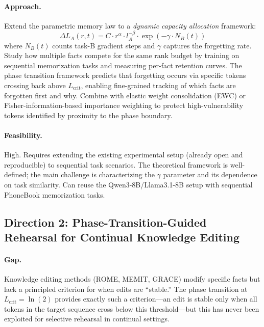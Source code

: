 \documentclass[11pt,a4paper]{article}
\begin{document}
\paragraph{Approach.} Extend the parametric memory law to a \emph{dynamic capacity allocation} framework:
\begin{equation}
\Delta L_A(r, t) = C \cdot r^{\alpha} \cdot l_A^{-\beta} \cdot \exp(-\gamma \cdot N_B(t))
\end{equation}
where $N_B(t)$ counts task-B gradient steps and $\gamma$ captures the forgetting rate. Study how multiple facts compete for the same rank budget by training on sequential memorization tasks and measuring per-fact retention curves. The phase transition framework predicts that forgetting occurs via specific tokens crossing back above $L_{\mathrm{crit}}$, enabling fine-grained tracking of which facts are forgotten first and why. Combine with elastic weight consolidation (EWC) or Fisher-information-based importance weighting to protect high-vulnerability tokens identified by proximity to the phase boundary.

\paragraph{Feasibility.} High. Requires extending the existing experimental setup (already open and reproducible) to sequential task scenarios. The theoretical framework is well-defined; the main challenge is characterizing the $\gamma$ parameter and its dependence on task similarity. Can reuse the Qwen3-8B/Llama3.1-8B setup with sequential PhoneBook memorization tasks.

\subsection{Direction 2: Phase-Transition-Guided Rehearsal for Continual Knowledge Editing}

\paragraph{Gap.} Knowledge editing methods (ROME, MEMIT, GRACE) modify specific facts but lack a principled criterion for when edits are ``stable.'' The phase transition at $L_{\mathrm{crit}} = \ln(2)$ provides exactly such a criterion---an edit is stable only when all tokens in the target sequence cross below this threshold---but this has never been exploited for selective rehearsal in continual settings.
\end{document}
